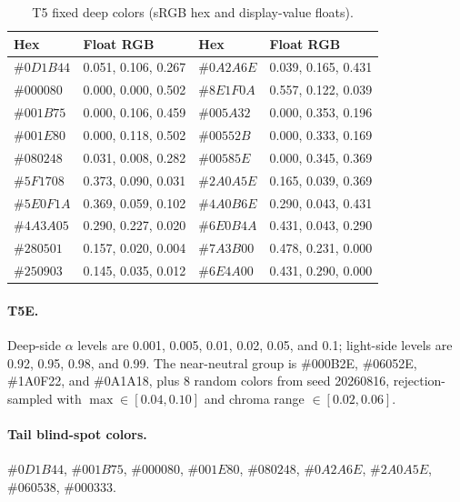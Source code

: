 \begin{table}[t]
\centering
\small
\caption{T5 fixed deep colors (sRGB hex and display-value floats).}
\label{tab:t5colors}
\begin{tabular}{llll}
\toprule
Hex & Float RGB & Hex & Float RGB \\
\midrule
$\#0D1B44$ & 0.051, 0.106, 0.267 & $\#0A2A6E$ & 0.039, 0.165, 0.431 \\
$\#000080$ & 0.000, 0.000, 0.502 & $\#8E1F0A$ & 0.557, 0.122, 0.039 \\
$\#001B75$ & 0.000, 0.106, 0.459 & $\#005A32$ & 0.000, 0.353, 0.196 \\
$\#001E80$ & 0.000, 0.118, 0.502 & $\#00552B$ & 0.000, 0.333, 0.169 \\
$\#080248$ & 0.031, 0.008, 0.282 & $\#00585E$ & 0.000, 0.345, 0.369 \\
$\#5F1708$ & 0.373, 0.090, 0.031 & $\#2A0A5E$ & 0.165, 0.039, 0.369 \\
$\#5E0F1A$ & 0.369, 0.059, 0.102 & $\#4A0B6E$ & 0.290, 0.043, 0.431 \\
$\#4A3A05$ & 0.290, 0.227, 0.020 & $\#6E0B4A$ & 0.431, 0.043, 0.290 \\
$\#280501$ & 0.157, 0.020, 0.004 & $\#7A3B00$ & 0.478, 0.231, 0.000 \\
$\#250903$ & 0.145, 0.035, 0.012 & $\#6E4A00$ & 0.431, 0.290, 0.000 \\
\bottomrule
\end{tabular}
\end{table}

\paragraph{T5E.}
Deep-side $\alpha$ levels are 0.001, 0.005, 0.01, 0.02, 0.05, and 0.1; light-side levels are 0.92, 0.95, 0.98, and 0.99. The near-neutral group is \#000B2E, \#06052E, \#1A0F22, and \#0A1A18, plus 8 random colors from seed 20260816, rejection-sampled with $\max\in[0.04,0.10]$ and chroma range $\in[0.02,0.06]$.

\paragraph{Tail blind-spot colors.}
$\#0D1B44$, $\#001B75$, $\#000080$, $\#001E80$, $\#080248$, $\#0A2A6E$, $\#2A0A5E$, $\#060538$, $\#000333$.

